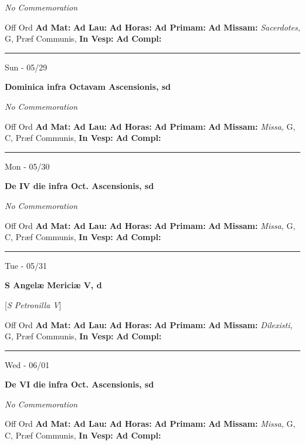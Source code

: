 \documentclass[letterpaper, 10pt]{article}
\begin{document}
\textit{No Commemoration}\begin{justify}
Off Ord
\textbf{Ad Mat: }
\textbf{Ad Lau: }
\textbf{Ad Horas: }
\textbf{Ad Primam: }
\textbf{Ad Missam:} \textit{Sacerdotes, } G, Præf Communis, 
\textbf{In Vesp: }
\textbf{Ad Compl: }\end{justify}



\hrule
\begin{center}
Sun - 05/29
\end{center}\textbf{ \large Dominica infra Octavam Ascensionis, \textnormal{\normalsize sd}}

\textit{No Commemoration}\begin{justify}
Off Ord
\textbf{Ad Mat: }
\textbf{Ad Lau: }
\textbf{Ad Horas: }
\textbf{Ad Primam: }
\textbf{Ad Missam:} \textit{Missa, } G, C, Præf Communis, 
\textbf{In Vesp: }
\textbf{Ad Compl: }\end{justify}



\hrule
\begin{center}
Mon - 05/30
\end{center}\textbf{ \large De IV die infra Oct. Ascensionis, \textnormal{\normalsize sd}}

\textit{No Commemoration}\begin{justify}
Off Ord
\textbf{Ad Mat: }
\textbf{Ad Lau: }
\textbf{Ad Horas: }
\textbf{Ad Primam: }
\textbf{Ad Missam:} \textit{Missa, } G, C, Præf Communis, 
\textbf{In Vesp: }
\textbf{Ad Compl: }\end{justify}



\hrule
\begin{center}
Tue - 05/31
\end{center}\textbf{ \large S Angelæ Mericiæ V, \textnormal{\normalsize d}}

[\textit{S Petronilla V}]
\begin{justify}
Off Ord
\textbf{Ad Mat: }
\textbf{Ad Lau: }
\textbf{Ad Horas: }
\textbf{Ad Primam: }
\textbf{Ad Missam:} \textit{Dilexisti, } G, Præf Communis, 
\textbf{In Vesp: }
\textbf{Ad Compl: }\end{justify}



\hrule
\begin{center}
Wed - 06/01
\end{center}\textbf{ \large De VI die infra Oct. Ascensionis, \textnormal{\normalsize sd}}

\textit{No Commemoration}\begin{justify}
Off Ord
\textbf{Ad Mat: }
\textbf{Ad Lau: }
\textbf{Ad Horas: }
\textbf{Ad Primam: }
\textbf{Ad Missam:} \textit{Missa, } G, C, Præf Communis, 
\textbf{In Vesp: }
\textbf{Ad Compl: }\end{justify}
\end{document}
